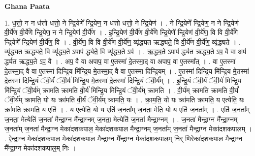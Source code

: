 \documentclass[17pt]{extarticle}
\begin{document}
\textbf{Ghana Paata } \newline

1. ध॒त्तो॒ न न ध॑त्तो धत्तो॒ ने न्द्रि॒येणे᳚ न्द्रि॒येण॒ न ध॑त्तो धत्तो॒ ने न्द्रि॒येण॑ । . ने न्द्रि॒येणे᳚ न्द्रि॒येण॒ न ने न्द्रि॒येण॑ वी॒र्ये॑ण वी॒र्ये॑णे न्द्रि॒येण॒ न ने न्द्रि॒येण॑ वी॒र्ये॑ण । . इ॒न्द्रि॒येण॑ वी॒र्ये॑ण वी॒र्ये॑णे न्द्रि॒येणे᳚ न्द्रि॒येण॑ वी॒र्ये॑ण॒ वि वि वी॒र्ये॑णे न्द्रि॒येणे᳚ न्द्रि॒येण॑ वी॒र्ये॑ण॒ वि । . वी॒र्ये॑ण॒ वि वि वी॒र्ये॑ण वी॒र्ये॑ण॒ व्यृ॑द्ध्यत ऋद्ध्यते॒ वि वी॒र्ये॑ण वी॒र्ये॑ण॒ व्यृ॑द्ध्यते । . व्यृ॑द्ध्यत ऋद्ध्यते॒ वि व्यृ॑द्ध्य॒ते ऽपाप॑ र्द्ध्यते॒ वि व्यृ॑द्ध्य॒ते ऽप॑ । . ऋ॒द्ध्य॒ते ऽपाप॑ र्द्ध्यत ऋद्ध्य॒ते ऽप॒ वै वा अप॑ र्द्ध्यत ऋद्ध्य॒ते ऽप॒ वै । . अप॒ वै वा अपाप॒ वा ए॒तस्मा॑ दे॒तस्मा॒द् वा अपाप॒ वा ए॒तस्मा᳚त् । . वा ए॒तस्मा॑ दे॒तस्मा॒द् वै वा ए॒तस्मा॑ दिन्द्रि॒य मि॑न्द्रि॒य मे॒तस्मा॒द् वै वा ए॒तस्मा॑ दिन्द्रि॒यम् । . ए॒तस्मा॑ दिन्द्रि॒य मि॑न्द्रि॒य मे॒तस्मा॑ दे॒तस्मा॑ दिन्द्रि॒यं ॅवी॒र्यं॑ ॅवी॒र्य॑ मिन्द्रि॒य मे॒तस्मा॑ दे॒तस्मा॑ दिन्द्रि॒यं ॅवी॒र्य᳚म् । . इ॒न्द्रि॒यं ॅवी॒र्यं॑ ॅवी॒र्य॑ मिन्द्रि॒य मि॑न्द्रि॒यं ॅवी॒र्य॑म् क्रामति क्रामति वी॒र्य॑ मिन्द्रि॒य मि॑न्द्रि॒यं ॅवी॒र्य॑म् क्रामति । . वी॒र्य॑म् क्रामति क्रामति वी॒र्यं॑ ॅवी॒र्य॑म् क्रामति॒ यो यः क्रा॑मति वी॒र्यं॑ ॅवी॒र्य॑म् क्रामति॒ यः । . क्रा॒म॒ति॒ यो यः क्रा॑मति क्रामति॒ य एत्येति॒ यः क्रा॑मति क्रामति॒ य एति॑ । . य एत्येति॒ यो य एति॑ ज॒नता᳚म् ज॒नता॒ मेति॒ यो य एति॑ ज॒नता᳚म् । . एति॑ ज॒नता᳚म् ज॒नता॒ मेत्येति॑ ज॒नता॑ मैन्द्रा॒ग्न मै᳚न्द्रा॒ग्नम् ज॒नता॒ मेत्येति॑ ज॒नता॑ मैन्द्रा॒ग्नम् । . ज॒नता॑ मैन्द्रा॒ग्न मै᳚न्द्रा॒ग्नम् ज॒नता᳚म् ज॒नता॑ मैन्द्रा॒ग्न मेका॑दशकपाल॒ मेका॑दशकपाल मैन्द्रा॒ग्नम् ज॒नता᳚म् ज॒नता॑ मैन्द्रा॒ग्न मेका॑दशकपालम् । . ऐ॒न्द्रा॒ग्न मेका॑दशकपाल॒ मेका॑दशकपाल मैन्द्रा॒ग्न मै᳚न्द्रा॒ग्न मेका॑दशकपाल॒म् निर् णिरेका॑दशकपाल मैन्द्रा॒ग्न मै᳚न्द्रा॒ग्न मेका॑दशकपाल॒म् निः । \newline
\end{document}
